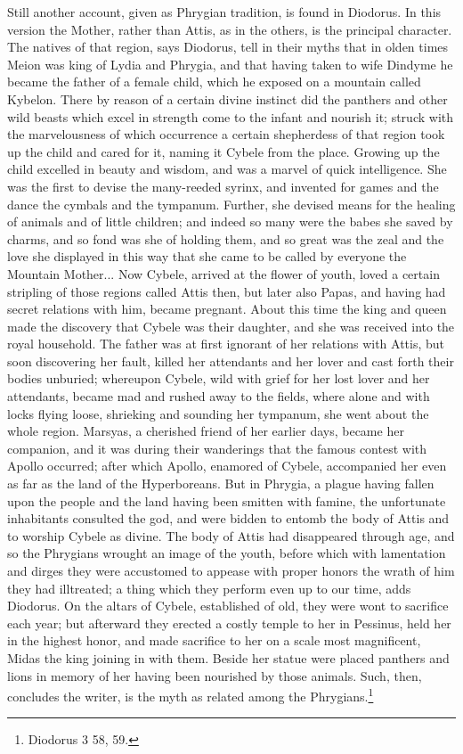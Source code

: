 \documentclass[a4paper, 11pt, oneside, polutonikogreek, french]{article}
\begin{document}
Still another account, given as Phrygian tradition, is found in Diodorus. In this version the Mother, rather than Attis, as in the others, is the principal character. The natives of that region, says Diodorus, tell in their myths that in olden times Meion was king of Lydia and Phrygia, and that having taken to wife Dindyme he became the father of a female child, which he exposed on a mountain called Kybelon. There by reason of a certain divine instinct did the panthers and other wild beasts which excel in strength come to the infant and nourish it; struck with the marvelousness of which occurrence a certain shepherdess of that region took up the child and cared for it, naming it Cybele from the place. Growing up the child excelled in beauty and wisdom, and was a marvel of quick intelligence. She was the first to devise the many-reeded syrinx, and invented for games and the dance the cymbals and the tympanum. Further, she devised means for the healing of animals and of little children; and indeed so many were the babes she saved by charms, and so fond was she of holding them, and so great was the zeal and the love she displayed in this way that she came to be called by everyone the Mountain Mother... Now Cybele, arrived at the flower of youth, loved a certain stripling of those regions called Attis then, but later also Papas, and having had secret relations with him, became pregnant. About this time the king and queen made the discovery that Cybele was their daughter, and she was received into the royal household. The father was at first ignorant of her relations with Attis, but soon discovering her fault, killed her attendants and her lover and cast forth their bodies unburied; whereupon Cybele, wild with grief for her lost lover and her attendants, became mad and rushed away to the fields, where alone and with locks flying loose, shrieking and sounding her tympanum, she went about the whole region. Marsyas, a cherished friend of her earlier days, became her companion, and it was during their wanderings that the famous contest with Apollo occurred; after which Apollo, enamored of Cybele, accompanied her even as far as the land of the Hyperboreans. But in Phrygia, a plague having fallen upon the people and the land having been smitten with famine, the unfortunate inhabitants consulted the god, and were bidden to entomb the body of Attis and to worship Cybele as divine. The body of Attis had disappeared through age, and so the Phrygians wrought an image of the youth, before which with lamentation and dirges they were accustomed to appease with proper honors the wrath of him they had illtreated; a thing which they perform even up to our time, adds Diodorus. On the altars of Cybele, established of old, they were wont to sacrifice each year; but afterward they erected a costly temple to her in Pessinus, held her in the highest honor, and made sacrifice to her on a scale most magnificent, Midas the king joining in with them. Beside her statue were placed panthers and lions in memory of her having been nourished by those animals. Such, then, concludes the writer, is the myth as related among the Phrygians.\footnote{Diodorus 3 58, 59.}
\end{document}
